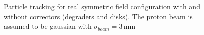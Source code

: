 \begin{figure}[!h]
	\begin{center}
		
	\end{center}
	\caption[Particle tracking for real symmetric field configuration with and without correctors]{Particle tracking for real symmetric field configuration with and without correctors (degraders and disks). The proton beam is assumed to be gaussian with $\sigma_{beam}=3\,\mathrm{mm}$}
	\label{chap3:SymTransversalProfile}
\end{figure}
